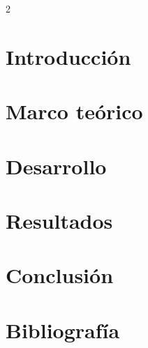 \documentclass[10pt,a4paper]{article}
\begin{document}
\onecolumn



\begin{multicols}{2}
\section{Introducción}
   

\section{Marco teórico}
   

\section{Desarrollo}


\end{multicols}
\section{Resultados}


\section{Conclusión}


\newpage
\section{Bibliografía}

\end{document}
